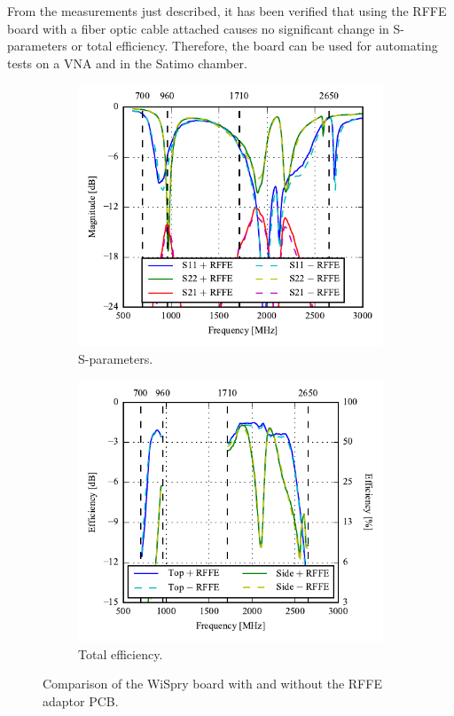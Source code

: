 From the measurements just described, it has been verified that using the RFFE board with a fiber optic cable attached causes no significant change in S-parameters or total efficiency. Therefore, the board can be used for automating tests on a VNA and in the Satimo chamber.

\begin{figure}[htbp]
    \centering
    \begin{subfigure}[t]{0.49\linewidth}
        \includegraphics{img/optical_rffe/compare_sparams}
        \caption{S-parameters.} 
    \end{subfigure}
    \hfill
    \begin{subfigure}[t]{0.49\linewidth}
        \includegraphics{img/optical_rffe/compare_efficiency}
        \caption{Total efficiency.} 
    \end{subfigure}
    \caption{Comparison of the WiSpry board with and without the RFFE adaptor PCB.}
    \label{fig:rffe_test_results}
\end{figure}

